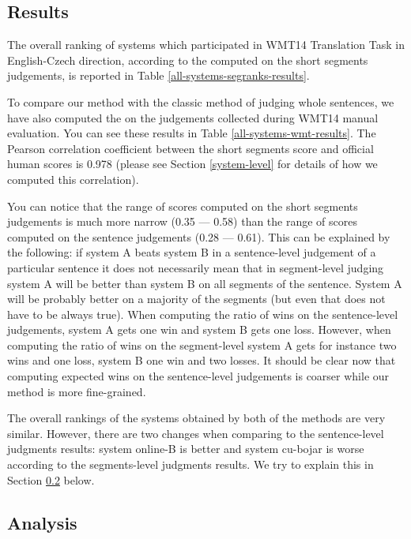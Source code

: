 \subsection{Results}

The overall ranking of systems which participated in WMT14 Translation Task in
English-Czech direction, according to the  computed on the short segments judgements, is reported in Table
\ref{all-systems-segranks-results}.

To compare our method with the classic method of judging whole sentences, we
have also computed the  on the judgements
collected during WMT14 manual evaluation. You can see these results in Table
\ref{all-systems-wmt-results}.  The Pearson correlation coefficient between the
short segments score and official human scores is 0.978 (please see Section
\ref{system-level} for details of how we computed this correlation).

You can notice that the range of scores computed on the short segments
judgements is much more narrow (0.35 --- 0.58) than the range of scores computed
on the sentence judgements (0.28 --- 0.61). This can be explained by the
following: if system A beats system B in a sentence-level judgement of a
particular sentence it does not necessarily mean that in segment-level judging
system A will be better than system B on all segments of the sentence. System A
will be probably better on a majority of the segments (but even that does not
have to be always true). When computing the ratio of wins on the sentence-level
judgements, system A gets one win and system B gets one loss. However, when
computing the ratio of wins on the segment-level system A gets for instance two
wins and one loss, system B one win and two losses. It should be clear now that
computing expected wins on the sentence-level judgements is coarser while our
method is more fine-grained.

The overall rankings of the systems obtained by both of the methods are very
similar. However, there are two changes when comparing to the sentence-level
judgments results: system online-B is better and system cu-bojar is worse
according to the segments-level judgments results. We try to explain this in 
Section \ref{analysis} below.

\subsection{Analysis}
\label{analysis}

